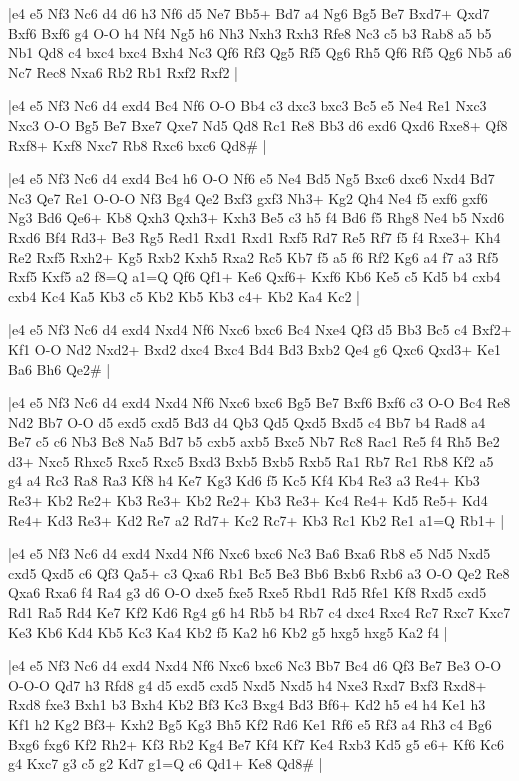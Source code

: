 \whitename{}
\blackname{}
\makegametitle
|e4 e5 Nf3 Nc6 d4 d6 h3 Nf6 d5 Ne7 Bb5+ Bd7 a4 Ng6 Bg5 Be7 Bxd7+ Qxd7 Bxf6 Bxf6 g4 O-O h4 Nf4 Ng5 h6 Nh3 Nxh3 Rxh3 Rfe8 Nc3 c5 b3 Rab8 a5 b5 Nb1 Qd8 c4 bxc4 bxc4 Bxh4 Nc3 Qf6 Rf3 Qg5 Rf5 Qg6 Rh5 Qf6 Rf5 Qg6 Nb5 a6 Nc7 Rec8 Nxa6 Rb2 Rb1 Rxf2 Rxf2  |

\whitename{}
\blackname{}
\makegametitle
|e4 e5 Nf3 Nc6 d4 exd4 Bc4 Nf6 O-O Bb4 c3 dxc3 bxc3 Bc5 e5 Ne4 Re1 Nxc3 Nxc3 O-O Bg5 Be7 Bxe7 Qxe7 Nd5 Qd8 Rc1 Re8 Bb3 d6 exd6 Qxd6 Rxe8+ Qf8 Rxf8+ Kxf8 Nxc7 Rb8 Rxc6 bxc6 Qd8\#  |

\whitename{}
\blackname{}
\makegametitle
|e4 e5 Nf3 Nc6 d4 exd4 Bc4 h6 O-O Nf6 e5 Ne4 Bd5 Ng5 Bxc6 dxc6 Nxd4 Bd7 Nc3 Qe7 Re1 O-O-O Nf3 Bg4 Qe2 Bxf3 gxf3 Nh3+ Kg2 Qh4 Ne4 f5 exf6 gxf6 Ng3 Bd6 Qe6+ Kb8 Qxh3 Qxh3+ Kxh3 Be5 c3 h5 f4 Bd6 f5 Rhg8 Ne4 b5 Nxd6 Rxd6 Bf4 Rd3+ Be3 Rg5 Red1 Rxd1 Rxd1 Rxf5 Rd7 Re5 Rf7 f5 f4 Rxe3+ Kh4 Re2 Rxf5 Rxh2+ Kg5 Rxb2 Kxh5 Rxa2 Rc5 Kb7 f5 a5 f6 Rf2 Kg6 a4 f7 a3 Rf5 Rxf5 Kxf5 a2 f8=Q a1=Q Qf6 Qf1+ Ke6 Qxf6+ Kxf6 Kb6 Ke5 c5 Kd5 b4 cxb4 cxb4 Kc4 Ka5 Kb3 c5 Kb2 Kb5 Kb3 c4+ Kb2 Ka4 Kc2  |

\whitename{}
\blackname{}
\makegametitle
|e4 e5 Nf3 Nc6 d4 exd4 Nxd4 Nf6 Nxc6 bxc6 Bc4 Nxe4 Qf3 d5 Bb3 Bc5 c4 Bxf2+ Kf1 O-O Nd2 Nxd2+ Bxd2 dxc4 Bxc4 Bd4 Bd3 Bxb2 Qe4 g6 Qxc6 Qxd3+ Ke1 Ba6 Bh6 Qe2\#  |

\whitename{}
\blackname{}
\makegametitle
|e4 e5 Nf3 Nc6 d4 exd4 Nxd4 Nf6 Nxc6 bxc6 Bg5 Be7 Bxf6 Bxf6 c3 O-O Bc4 Re8 Nd2 Bb7 O-O d5 exd5 cxd5 Bd3 d4 Qb3 Qd5 Qxd5 Bxd5 c4 Bb7 b4 Rad8 a4 Be7 c5 c6 Nb3 Bc8 Na5 Bd7 b5 cxb5 axb5 Bxc5 Nb7 Rc8 Rac1 Re5 f4 Rh5 Be2 d3+ Nxc5 Rhxc5 Rxc5 Rxc5 Bxd3 Bxb5 Bxb5 Rxb5 Ra1 Rb7 Rc1 Rb8 Kf2 a5 g4 a4 Rc3 Ra8 Ra3 Kf8 h4 Ke7 Kg3 Kd6 f5 Kc5 Kf4 Kb4 Re3 a3 Re4+ Kb3 Re3+ Kb2 Re2+ Kb3 Re3+ Kb2 Re2+ Kb3 Re3+ Kc4 Re4+ Kd5 Re5+ Kd4 Re4+ Kd3 Re3+ Kd2 Re7 a2 Rd7+ Kc2 Rc7+ Kb3 Rc1 Kb2 Re1 a1=Q Rb1+  |

\whitename{}
\blackname{}
\makegametitle
|e4 e5 Nf3 Nc6 d4 exd4 Nxd4 Nf6 Nxc6 bxc6 Nc3 Ba6 Bxa6 Rb8 e5 Nd5 Nxd5 cxd5 Qxd5 c6 Qf3 Qa5+ c3 Qxa6 Rb1 Bc5 Be3 Bb6 Bxb6 Rxb6 a3 O-O Qe2 Re8 Qxa6 Rxa6 f4 Ra4 g3 d6 O-O dxe5 fxe5 Rxe5 Rbd1 Rd5 Rfe1 Kf8 Rxd5 cxd5 Rd1 Ra5 Rd4 Ke7 Kf2 Kd6 Rg4 g6 h4 Rb5 b4 Rb7 c4 dxc4 Rxc4 Rc7 Rxc7 Kxc7 Ke3 Kb6 Kd4 Kb5 Kc3 Ka4 Kb2 f5 Ka2 h6 Kb2 g5 hxg5 hxg5 Ka2 f4  |

\whitename{}
\blackname{}
\makegametitle
|e4 e5 Nf3 Nc6 d4 exd4 Nxd4 Nf6 Nxc6 bxc6 Nc3 Bb7 Bc4 d6 Qf3 Be7 Be3 O-O O-O-O Qd7 h3 Rfd8 g4 d5 exd5 cxd5 Nxd5 Nxd5 h4 Nxe3 Rxd7 Bxf3 Rxd8+ Rxd8 fxe3 Bxh1 b3 Bxh4 Kb2 Bf3 Kc3 Bxg4 Bd3 Bf6+ Kd2 h5 e4 h4 Ke1 h3 Kf1 h2 Kg2 Bf3+ Kxh2 Bg5 Kg3 Bh5 Kf2 Rd6 Ke1 Rf6 e5 Rf3 a4 Rh3 c4 Bg6 Bxg6 fxg6 Kf2 Rh2+ Kf3 Rb2 Kg4 Be7 Kf4 Kf7 Ke4 Rxb3 Kd5 g5 e6+ Kf6 Kc6 g4 Kxc7 g3 c5 g2 Kd7 g1=Q c6 Qd1+ Ke8 Qd8\#  |

